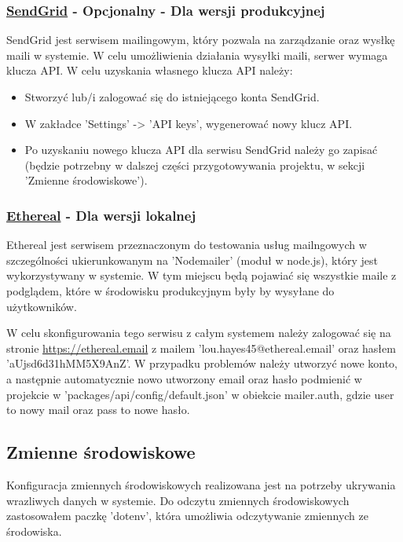 \subsubsection{\href{https://sendgrid.com/}{SendGrid} - Opcjonalny - Dla wersji produkcyjnej}

SendGrid jest serwisem mailingowym, który pozwala na zarządzanie oraz wysłkę maili w systemie. W celu umożliwienia działania wysyłki maili, serwer wymaga klucza API. W celu uzyskania własnego klucza API należy:

\begin{itemize}
	\item Stworzyć lub/i zalogować się do istniejącego konta SendGrid.
	\item W zakładce 'Settings' -> 'API keys', wygenerować nowy klucz API.
	\item Po uzyskaniu nowego klucza API dla serwisu SendGrid należy go zapisać (będzie potrzebny w dalszej części przygotowywania projektu, w sekcji 'Zmienne środowiskowe').
\end{itemize}

\subsubsection{\href{https://ethereal.email/}{Ethereal} - Dla wersji lokalnej}

Ethereal jest serwisem przeznaczonym do testowania usług mailngowych w szczególności ukierunkowanym na 'Nodemailer' (moduł w node.js), który jest wykorzystywany w systemie. W tym miejscu będą pojawiać się wszystkie maile z podglądem, które w środowisku produkcyjnym były by wysyłane do użytkowników.

W celu skonfigurowania tego serwisu z całym systemem należy zalogować się na stronie \url{https://ethereal.email} z mailem
'lou.hayes45@ethereal.email' oraz hasłem 'aUjsd6d31hMM5X9AnZ'. W przypadku problemów należy utworzyć nowe konto, a następnie automatycznie nowo utworzony email oraz hasło podmienić w projekcie w 'packages/api/config/default.json' w obiekcie mailer.auth, gdzie user to nowy mail oraz pass to nowe hasło.

\subsection{Zmienne środowiskowe}

Konfiguracja zmiennych środowiskowych realizowana jest na potrzeby ukrywania wrazliwych danych w systemie.
Do odczytu zmiennych środowiskowych zastosowałem paczkę 'dotenv', która umożliwia odczytywanie zmiennych ze środowiska.

